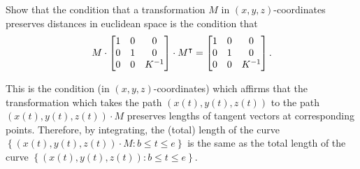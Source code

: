\documentclass{ximera}
\begin{document}


\begin{problem}
Show that the condition that a transformation $M$ in
$\left(x,y,z\right)$-coordinates preserves distances in euclidean
space is the condition that%
\[
M\cdot\begin{bmatrix}
1 & 0 & 0\\
0 & 1 & 0\\
0 & 0 & K^{-1}
\end{bmatrix}
  \cdot M^\intercal=\begin{bmatrix}
1 & 0 & 0\\
0 & 1 & 0\\
0 & 0 & K^{-1}
\end{bmatrix}. 
\]

\end{problem}

This is the condition (in $\left(  x,y,z\right)  $-coordinates) which affirms
that the transformation which takes the path $\left(  x(t),y(t),z(t)\right)  $
to the path $\left(  x(t),y(t),z(t)\right)  \cdot M$ preserves lengths of
tangent vectors at corresponding points. Therefore, by integrating, the
(total) length of the curve $\left\{  \left(  x(t),y(t),z(t)\right)  \cdot
M:b\leq t\leq e\right\}  $ is the same as the total length of the curve
$\left\{  \left(  x(t),y(t),z(t)\right)  :b\leq t\leq e\right\}  $.
\end{document}
